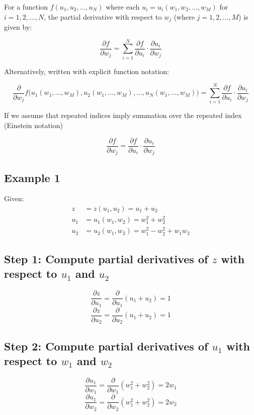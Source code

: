 \documentclass{tufte-handout}
\begin{document}
For a function $f(u_1, u_2, \ldots, u_N)$ where each $u_i = u_i(w_1, w_2, \ldots, w_M)$ for $i = 1, 2, \ldots, N$, the partial derivative with respect to $w_j$ (where $j = 1, 2, \ldots, M$) is given by:

\[
\frac{\partial f}{\partial w_j} = \sum_{i=1}^{N} \frac{\partial f}{\partial u_i} \cdot \frac{\partial u_i}{\partial w_j}
\]

Alternatively, written with explicit function notation:

\[
\frac{\partial}{\partial w_j} f\big(u_1(w_1,\ldots,w_M), u_2(w_1,\ldots,w_M), \ldots, u_N(w_1,\ldots,w_M)\big) = \sum_{i=1}^{N} \frac{\partial f}{\partial u_i} \cdot \frac{\partial u_i}{\partial w_j}
\]

If we assume that repeated indices imply summation over the repeated index (Einstein notation) 

\[
\frac{\partial f}{\partial w_j} = \frac{\partial f}{\partial u_i} \cdot \frac{\partial u_i}{\partial w_j}
\]

\subsection{Example 1}


Given:
\begin{align*}
z &= z(u_1, u_2) = u_1 + u_2 \\
u_1 &= u_1(w_1, w_2) = w_1^2 + w_2^2 \\
u_2 &= u_2(w_1, w_2) = w_1^2 - w_2^2 + w_1 w_2
\end{align*}

\subsection*{Step 1: Compute partial derivatives of $z$ with respect to $u_1$ and $u_2$}

\[
\frac{\partial z}{\partial u_1} = \frac{\partial}{\partial u_1}(u_1 + u_2) = 1
\]
\[
\frac{\partial z}{\partial u_2} = \frac{\partial}{\partial u_2}(u_1 + u_2) = 1
\]

\subsection*{Step 2: Compute partial derivatives of $u_1$ with respect to $w_1$ and $w_2$}

\[
\frac{\partial u_1}{\partial w_1} = \frac{\partial}{\partial w_1}(w_1^2 + w_2^2) = 2w_1
\]
\[
\frac{\partial u_1}{\partial w_2} = \frac{\partial}{\partial w_2}(w_1^2 + w_2^2) = 2w_2
\]
\end{document}
